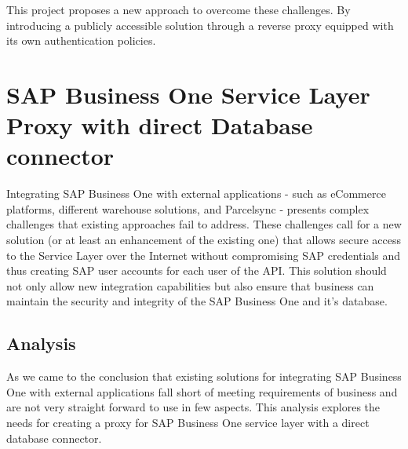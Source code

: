 This project proposes a new approach to overcome these challenges.
By introducing a publicly accessible solution through a reverse proxy equipped with its own authentication policies.

\section{SAP Business One Service Layer Proxy with direct Database connector}
\label{sec:sap-b1-service-layer-proxy}
Integrating SAP Business One with external applications - such as eCommerce platforms, different warehouse solutions, and Parcelsync - presents complex challenges that existing  approaches fail to address. 
These challenges call for a new solution (or at least an enhancement of the existing one) that allows secure access to the Service Layer over the Internet without compromising SAP credentials and thus creating SAP user accounts for each user of the API.
This solution should not only allow new integration capabilities but also ensure that business can maintain the security and integrity of the SAP Business One and it's database.

\subsection{Analysis}
\label{subsec:analysis}
As we came to the conclusion that existing solutions for integrating SAP Business One with external applications fall short of meeting requirements of business and are not very straight forward to use in few aspects.
This analysis explores the needs for creating a proxy for SAP Business One service layer with a direct database connector.

